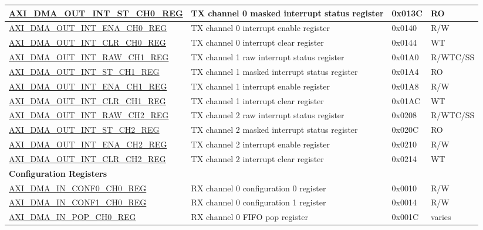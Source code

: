 \begin{longtable}{ | l | p{10cm} | p{1.3cm} | l | }
\hyperref[regdesc:AXIDMAOUTINTSTCHNREG]{AXI\_DMA\_OUT\_INT\_ST\_CH0\_REG} & TX channel 0 masked interrupt status register & 0x013C & RO \\ \hline
\hyperref[regdesc:AXIDMAOUTINTENACHNREG]{AXI\_DMA\_OUT\_INT\_ENA\_CH0\_REG} & TX channel 0 interrupt enable register & 0x0140 & R/W \\ \hline
\hyperref[regdesc:AXIDMAOUTINTCLRCHNREG]{AXI\_DMA\_OUT\_INT\_CLR\_CH0\_REG} & TX channel 0 interrupt clear register & 0x0144 & WT \\ \hline
\hyperref[regdesc:AXIDMAOUTINTRAWCHNREG]{AXI\_DMA\_OUT\_INT\_RAW\_CH1\_REG} & TX channel 1 raw interrupt status register & 0x01A0 & R/WTC/SS \\ \hline
\hyperref[regdesc:AXIDMAOUTINTSTCHNREG]{AXI\_DMA\_OUT\_INT\_ST\_CH1\_REG} & TX channel 1 masked interrupt status register & 0x01A4 & RO \\ \hline
\hyperref[regdesc:AXIDMAOUTINTENACHNREG]{AXI\_DMA\_OUT\_INT\_ENA\_CH1\_REG} & TX channel 1 interrupt enable register & 0x01A8 & R/W \\ \hline
\hyperref[regdesc:AXIDMAOUTINTCLRCHNREG]{AXI\_DMA\_OUT\_INT\_CLR\_CH1\_REG} & TX channel 1 interrupt clear register & 0x01AC & WT \\ \hline
\hyperref[regdesc:AXIDMAOUTINTRAWCHNREG]{AXI\_DMA\_OUT\_INT\_RAW\_CH2\_REG} & TX channel 2 raw interrupt status register & 0x0208 & R/WTC/SS \\ \hline
\hyperref[regdesc:AXIDMAOUTINTSTCHNREG]{AXI\_DMA\_OUT\_INT\_ST\_CH2\_REG} & TX channel 2 masked interrupt status register & 0x020C & RO \\ \hline
\hyperref[regdesc:AXIDMAOUTINTENACHNREG]{AXI\_DMA\_OUT\_INT\_ENA\_CH2\_REG} & TX channel 2 interrupt enable register & 0x0210 & R/W \\ \hline
\hyperref[regdesc:AXIDMAOUTINTCLRCHNREG]{AXI\_DMA\_OUT\_INT\_CLR\_CH2\_REG} & TX channel 2 interrupt clear register & 0x0214 & WT \\ \hline
\multicolumn{4}{|l|}{\textbf{Configuration Registers}} \\ \hline
\hyperref[regdesc:AXIDMAINCONF0CHNREG]{AXI\_DMA\_IN\_CONF0\_CH0\_REG} & RX channel 0 configuration 0 register & 0x0010 & R/W \\ \hline
\hyperref[regdesc:AXIDMAINCONF1CHNREG]{AXI\_DMA\_IN\_CONF1\_CH0\_REG} & RX channel 0 configuration 1 register & 0x0014 & R/W \\ \hline
\hyperref[regdesc:AXIDMAINPOPCHNREG]{AXI\_DMA\_IN\_POP\_CH0\_REG} & RX channel 0 FIFO pop register & 0x001C & varies \\ \hline

\end{longtable}

